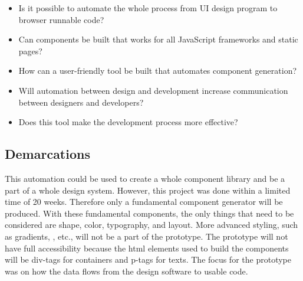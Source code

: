 \begin{itemize}
  \item Is it possible to automate the whole process from UI design program to browser runnable code? 
  \item Can \glspl{component} be built that works for all JavaScript frameworks and static pages? 
  \item How can a user-friendly tool be built that automates component generation? 
  \item Will automation between design and development increase communication between designers and developers? 
  \item Does this tool make the development process more effective?
\end{itemize}

\subsection{Demarcations}%
\label{sub:Demarcations}
This automation could be used to create a whole component library and be a part of a whole design system. However, this project was done within a limited time of 20 weeks. Therefore only a fundamental component generator will be produced. With these fundamental \glspl{component}, the only things that need to be considered are shape, color, typography, and layout. More advanced styling, such as gradients, , etc., will not be a part of the prototype. The prototype will not have full accessibility because the \acrshort{html} elements used to build the \glspl{component} will be \glspl{div-tag} for containers and \glspl{p-tag} for texts. The focus for the prototype was on how the data flows from the design software to usable code.




